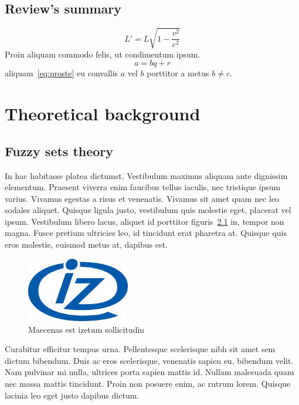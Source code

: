 \documentclass[english,masters]{wizthesis}
\begin{document}
\section{Review's summary}


\begin{equation} \label{eq:skomplikowane}
  L' = {L}{\sqrt{1-\frac{v^2}{c^2}}}
\end{equation}
Proin aliquam commodo felis, ut condimentum ipsum.
\begin{equation} \label{eq:proste}
  a = bq + r
\end{equation}
aliquam~\eqref{eq:proste} eu convallis \(a\) vel \(b\) porttitor a metus \(b
\neq c\).



\chapter{Theoretical background}
\section{Fuzzy sets theory}
In hac habitasse platea dictumst. Vestibulum maximus aliquam ante dignissim
elementum. Praesent viverra enim faucibus tellus iaculis, nec tristique ipsum
varius. Vivamus egestas a risus et venenatis. Vivamus sit amet quam nec leo
sodales aliquet. Quisque ligula justo, vestibulum quis molestie eget, placerat
vel ipsum. Vestibulum libero lacus, aliquet id porttitor figuris~\ref{fig:iz}
in, tempor non magna. Fusce pretium ultricies leo, id tincidunt erat pharetra
at. Quisque quis eros molestie, euismod metus at, dapibus est.
\begin{figure}[ht]
  \centering
  \includegraphics[width=0.4\textwidth]{img/iz_logo.png}
  \caption{Maecenas est izetum sollicitudin}
  \label{fig:iz}
\end{figure}

Curabitur efficitur tempus urna. Pellentesque scelerisque nibh sit amet sem
dictum bibendum. Duis ac eros scelerisque, venenatis sapien eu, bibendum velit.
Nam pulvinar mi nulla, ultrices porta sapien mattis id. Nullam malesuada quam
nec massa mattis tincidunt. Proin non posuere enim, ac rutrum lorem. Quisque
lacinia leo eget justo dapibus dictum.
\end{document}
